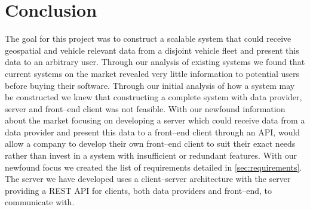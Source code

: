 \chapter{Conclusion}
The goal for this project was to construct a scalable system that could receive geospatial and vehicle relevant data from a disjoint vehicle fleet and present this data to an arbitrary user.
Through our analysis of existing systems we found that current systems on the market revealed very little information to potential users before buying their software.
Through our initial analysis of how a system may be constructed we knew that constructing a complete system with data provider, server and front--end client was not feasible.
With our newfound information about the market focusing on developing a server which could receive data from a data provider and present this data to a front--end client through an API, would allow a company to develop their own front--end client to suit their exact needs rather than invest in a system with insufficient or redundant features.
With our newfound focus we created the list of requirements detailed in \cref{sec:requirements}.
The server we have developed uses a client--server architecture with the server providing a REST API for clients, both data providers and front--end, to communicate with.

